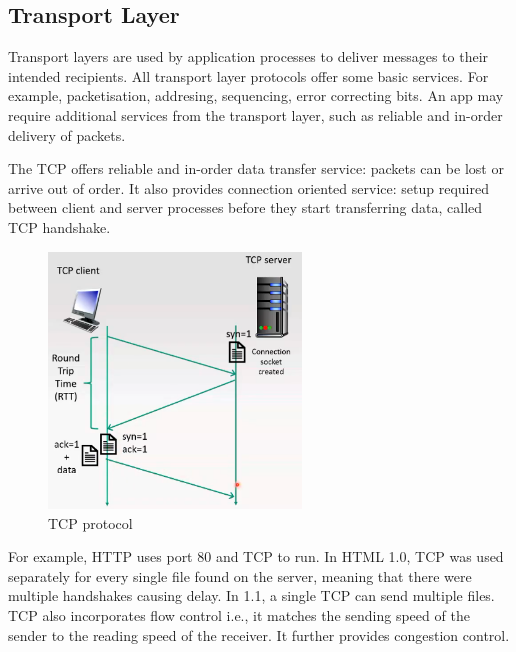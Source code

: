 \documentclass[a4paper]{article}
\theoremstyle{plain}
\theoremstyle{definition}
\newtheorem{defn}{Definition}[section]
\theoremstyle{remark}
\begin{document}
\subsection{Transport Layer}
Transport layers are used by application processes to deliver messages to their intended recipients. All transport layer protocols offer some basic services. For example, packetisation, addresing, sequencing, error correcting bits. An app may require additional services from the transport layer, such as reliable and in-order delivery of packets.
\begin{tcolorbox}[colback=black!3!white,colframe=black!60!white,title=\begin{defn}Transmission Control Protocol (TCP) \label{Transmission Control Protocol (TCP)}\end{defn}]
The TCP offers reliable and in-order data transfer service: packets can be lost or arrive out of order. It also provides connection oriented service: setup required between client and server processes before they start transferring data, called TCP handshake.
\begin{figure}[H]
	\centering
	\includegraphics[width=0.6\textwidth]{twentyfive.png}
	\caption{TCP protocol}
	\label{fig:twentyfive-png}
\end{figure}
For example, HTTP uses port 80 and TCP to run. In HTML 1.0, TCP was used separately for every single file found on the server, meaning that there were multiple handshakes causing delay. In 1.1, a single TCP can send multiple files. \\

TCP also incorporates flow control i.e., it matches the sending speed of the sender to the reading speed of the receiver. It further provides congestion control.
\end{tcolorbox}
\end{document}
